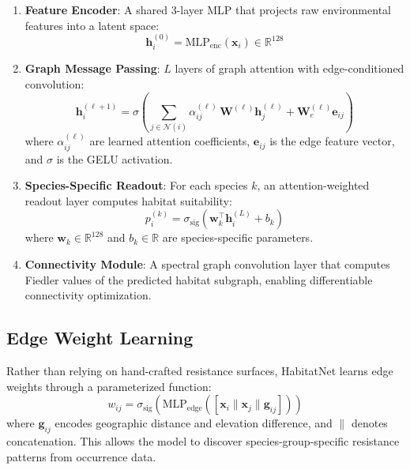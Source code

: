 \documentclass[11pt,a4paper]{article}
\newcommand{\R}{\mathbb{R}}
\begin{document}
\begin{enumerate}
  \item \textbf{Feature Encoder}: A shared 3-layer MLP that projects raw
    environmental features into a latent space:
    \begin{equation}
      \mathbf{h}_i^{(0)} = \text{MLP}_{\text{enc}}(\mathbf{x}_i)
      \in \R^{128}
    \end{equation}

  \item \textbf{Graph Message Passing}: $L$ layers of graph attention
    \citep{velickovic2018graph} with edge-conditioned convolution:
    \begin{equation}
      \mathbf{h}_i^{(\ell+1)} = \sigma\!\left(
        \sum_{j \in \mathcal{N}(i)} \alpha_{ij}^{(\ell)} \,
        \mathbf{W}^{(\ell)} \mathbf{h}_j^{(\ell)} +
        \mathbf{W}_e^{(\ell)} \mathbf{e}_{ij}
      \right)
    \end{equation}
    where $\alpha_{ij}^{(\ell)}$ are learned attention coefficients,
    $\mathbf{e}_{ij}$ is the edge feature vector, and
    $\sigma$ is the GELU activation.

  \item \textbf{Species-Specific Readout}: For each species $k$, an
    attention-weighted readout layer computes habitat suitability:
    \begin{equation}
      p_i^{(k)} = \sigma_{\text{sig}}\!\left(
        \mathbf{w}_k^\top \mathbf{h}_i^{(L)} + b_k
      \right)
    \end{equation}
    where $\mathbf{w}_k \in \R^{128}$ and $b_k \in \R$ are
    species-specific parameters.

  \item \textbf{Connectivity Module}: A spectral graph convolution layer
    that computes Fiedler values \citep{fiedler1973algebraic} of the
    predicted habitat subgraph, enabling differentiable connectivity
    optimization.
\end{enumerate}

\subsection{Edge Weight Learning}
\label{sec:edge_learning}

Rather than relying on hand-crafted resistance surfaces, HabitatNet
learns edge weights through a parameterized function:
\begin{equation}
  w_{ij} = \sigma_{\text{sig}}\!\left(
    \text{MLP}_{\text{edge}}([\mathbf{x}_i \| \mathbf{x}_j \|
    \mathbf{g}_{ij}])
  \right)
\end{equation}
where $\mathbf{g}_{ij}$ encodes geographic distance and elevation
difference, and $\|$ denotes concatenation. This allows the model to
discover species-group-specific resistance patterns from occurrence data.
\end{document}

